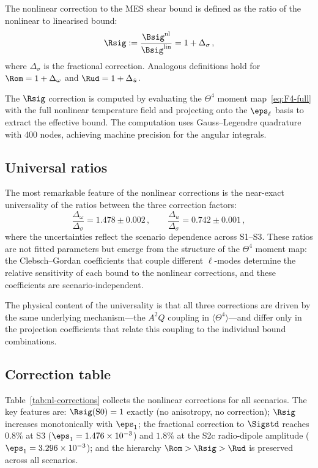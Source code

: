 The nonlinear correction to the MES shear bound is defined as
the ratio of the nonlinear to linearised bound:
\begin{equation}\label{eq:Rsig-def}
\Rsig := \frac{\Bsig^{\mathrm{nl}}}{\Bsig^{\mathrm{lin}}}
= 1 + \Delta_\sigma\,,
\end{equation}
where $\Delta_\sigma$ is the fractional correction.  Analogous
definitions hold for $\Rom = 1 + \Delta_\omega$ and
$\Rud = 1 + \Delta_{\dot{u}}$.

The $\Rsig$ correction is computed by evaluating the $\Theta^4$
moment map~\eqref{eq:F4-full} with the full nonlinear
temperature field and projecting onto the $\eps_\ell$ basis to
extract the effective bound.  The computation uses
Gauss--Legendre quadrature with 400 nodes, achieving machine
precision for the angular integrals.


\subsection{Universal ratios}\label{sec:universal}

The most remarkable feature of the nonlinear corrections is the
near-exact universality of the ratios between the three
correction factors:
\begin{equation}\label{eq:universal-ratios}
\frac{\Delta_\omega}{\Delta_\sigma}
= 1.478 \pm 0.002\,,\qquad
\frac{\Delta_{\dot{u}}}{\Delta_\sigma}
= 0.742 \pm 0.001\,,
\end{equation}
where the uncertainties reflect the scenario dependence across
S1--S3.  These ratios are not fitted parameters but emerge from
the structure of the $\Theta^4$ moment map: the Clebsch--Gordan
coefficients that couple different $\ell$-modes determine the
relative sensitivity of each bound to the nonlinear corrections,
and these coefficients are scenario-independent.

The physical content of the universality is that all three
corrections are driven by the same underlying mechanism---the
$A^2 Q$ coupling in $\langle\Theta^4\rangle$---and differ only
in the projection coefficients that relate this coupling to the
individual bound combinations.


\subsection{Correction table}\label{sec:correction-table}

Table~\ref{tab:nl-corrections} collects the nonlinear
corrections for all scenarios.  The key features are:
$\Rsig(\mathrm{S0}) = 1$ exactly (no anisotropy, no
correction); $\Rsig$ increases monotonically with $\eps_1$;
the fractional correction to $\Sigstd$ reaches $0.8\%$ at S3
($\eps_1 = 1.476 \times 10^{-3}$) and $1.8\%$ at the S2c
radio-dipole amplitude ($\eps_1 = 3.296 \times 10^{-3}$);
and the hierarchy $\Rom > \Rsig > \Rud$ is preserved across all
scenarios.

